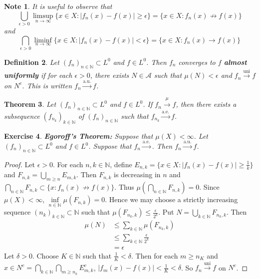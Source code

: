 \documentclass[12pt]{amsart}
\newtheorem{thm}{Theorem}[subsection]
\newtheorem{defn}[thm]{Definition}
\newtheorem{note}[thm]{Note}
\newtheorem{ex}[thm]{Exercise}
\newcommand{\del}{\delta}
\newcommand{\ep}{\epsilon}
\newcommand{\N}{\mathbb{N}}
\newcommand{\MA}{\mathcal{A}}
\newcommand{\convt}[1]{\xrightarrow{\text{#1}}}
\begin{document}
\begin{note}
	It is useful to observe that $$\bigcup_{\ep >0}\limsup\limits_{n \rightarrow \infty} \{x \in X: |f_n(x) - f(x)| \geq \ep \} = \{x \in X: f_n(x) \not \rightarrow f(x) \}$$ and $$\bigcap_{\ep > 0} \liminf_{n \rightarrow \infty}\{x \in X: |f_n(x) - f(x)| < \ep \} = \{x \in X: f_n(x) \rightarrow f(x) \}$$ 
\end{note}

\begin{defn}
	Let $(f_n)_{n \in \N} \subset L^0$ and $f \in L^0$. Then $f_n$ converges to $f$ \textbf{almost uniformly} if for each $\ep >0$, there exists $N \in \MA$ such that $\mu(N) < \ep$ and $f_n \xrightarrow{\text{uni}} f$ on $N^c$. This is written $f_n \xrightarrow{\text{a.u.}} f$.
\end{defn}

\begin{thm}
	Let $(f_n)_{n \in \N} \subset L^0$ and $f \in L^0$. If $f_n \xrightarrow{\mu} f$, then there exists a subsequence $(f_{n_k})_{k \in \N}$ of $(f_n)_{n \in \N}$ such that $f_{n_k} \xrightarrow{\text{a.e.}} f$.
\end{thm}

\begin{ex}\textbf{Egoroff's Theorem:}
	Suppose that $\mu(X) < \infty$. Let $(f_n)_{n \in \N} \subset L^0$ and $f \in L^0$. Suppose that $f_n \xrightarrow{\text{a.e.}}$. Then $f_n \xrightarrow{\text{a.u.}}f$.
\end{ex}

\begin{proof}
	Let $\ep >0$. For each $n, k \in \N$, define $E_{n, k} = \{x \in X: \vert f_n(x) - f(x) \vert \geq \frac{1}{k} \}$ and $F_{n,k} = \bigcup\limits_{m \geq n}E_{m,k}$. Then $F_{n,k}$ is decreasing in $n$ and $\bigcap\limits_{n \in \N}F_{n,k} \subset \{x: f_n(x) \not \rightarrow f(x)\}$. Thus $\mu(\bigcap\limits_{n \in \N}F_{n,k}) = 0$. Since $\mu(X) < \infty$, $\inf\limits_{n \in \N}\mu(F_{n,k}) = 0$. Hence we may choose a strictly increasing sequence $(n_k)_{k \in \N} \subset \N$ such that  $\mu(F_{n_k,k}) \leq \frac{\ep}{2^{k}}$. Put $N = \bigcup\limits_{k \in \N}F_{n_k,k}$. Then 
	\begin{align*}
		\mu(N) 
		&\leq \sum\limits_{k \in \N}\mu(F_{n_k,k}) \\
		& \leq \sum\limits_{k \in \N} \frac{\ep}{2^k}\\
		& = \ep
	\end{align*} 
	Let $\del > 0$. Choose $K \in \N$ such that $\frac{1}{K} < \del$. Then for each $m \geq n_K$ and $x \in N^c =\bigcap\limits_{k \in \N}\bigcap\limits_{m \geq n_k}E_{m,k}^c$, $|f_m(x)- f(x)| < \frac{1}{K} < \del$. So $f_n \convt{uni} f$ on $N^c$. 
\end{proof}
\end{document}
